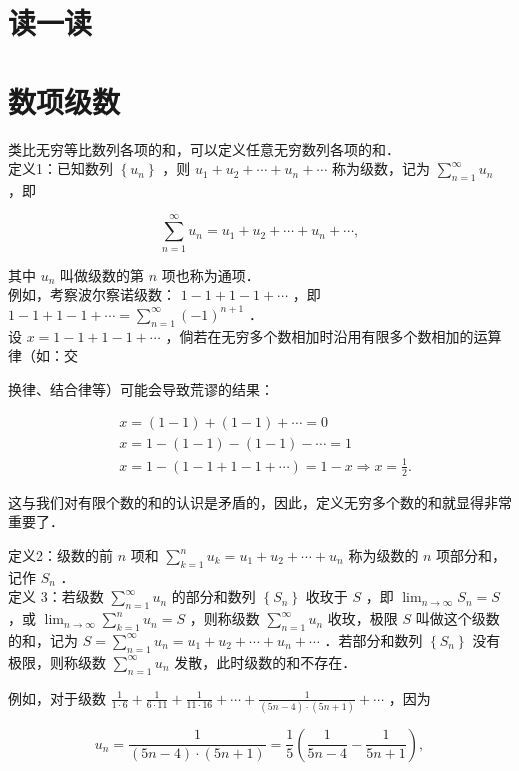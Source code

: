 \documentclass[10pt]{article}
\begin{document}
\section*{读一读}
\section*{数项级数}
类比无穷等比数列各项的和，可以定义任意无穷数列各项的和．\\
定义1：已知数列 \(\left\{u_{n}\right\}\) ，则 \(u_{1}+u_{2}+\cdots+u_{n}+\cdots\) 称为级数，记为 \(\sum_{n=1}^{\infty} u_{n}\) ，即

\[
\sum_{n=1}^{\infty} u_{n}=u_{1}+u_{2}+\cdots+u_{n}+\cdots,
\]

其中 \(u_{n}\) 叫做级数的第 \(n\) 项也称为通项．\\
例如，考察波尔察诺级数： \(1-1+1-1+\cdots\) ，即 \(1-1+1-1+\cdots=\sum_{n=1}^{\infty}(-1)^{n+1}\) ．\\
设 \(x=1-1+1-1+\cdots\) ，倘若在无穷多个数相加时沿用有限多个数相加的运算律（如：交

换律、结合律等）可能会导致荒谬的结果：

\[
\begin{aligned}
& x=(1-1)+(1-1)+\cdots=0 \\
& x=1-(1-1)-(1-1)-\cdots=1 \\
& x=1-(1-1+1-1+\cdots)=1-x \Rightarrow x=\frac{1}{2} .
\end{aligned}
\]

这与我们对有限个数的和的认识是矛盾的，因此，定义无穷多个数的和就显得非常重要了．

定义2：级数的前 \(n\) 项和 \(\sum_{k=1}^{n} u_{k}=u_{1}+u_{2}+\cdots+u_{n}\) 称为级数的 \(n\) 项部分和，记作 \(S_{n}\) ．\\
定义 3：若级数 \(\sum_{n=1}^{\infty} u_{n}\) 的部分和数列 \(\left\{S_{n}\right\}\) 收玫于 \(S\) ，即 \(\lim _{n \rightarrow \infty} S_{n}=S\) ，或 \(\lim _{n \rightarrow \infty} \sum_{k=1}^{n} u_{n}=S\) ，则称级数 \(\sum_{n=1}^{\infty} u_{n}\) 收玫，极限 \(S\) 叫做这个级数的和，记为 \(S=\sum_{n=1}^{\infty} u_{n}=u_{1}+u_{2}+\cdots+u_{n}+\cdots\) ．若部分和数列 \(\left\{S_{n}\right\}\) 没有极限，则称级数 \(\sum_{n=1}^{\infty} u_{n}\) 发散，此时级数的和不存在．

例如，对于级数 \(\frac{1}{1 \cdot 6}+\frac{1}{6 \cdot 11}+\frac{1}{11 \cdot 16}+\cdots+\frac{1}{(5 n-4) \cdot(5 n+1)}+\cdots\) ，因为

\[
u_{n}=\frac{1}{(5 n-4) \cdot(5 n+1)}=\frac{1}{5}\left(\frac{1}{5 n-4}-\frac{1}{5 n+1}\right),
\]
\end{document}

